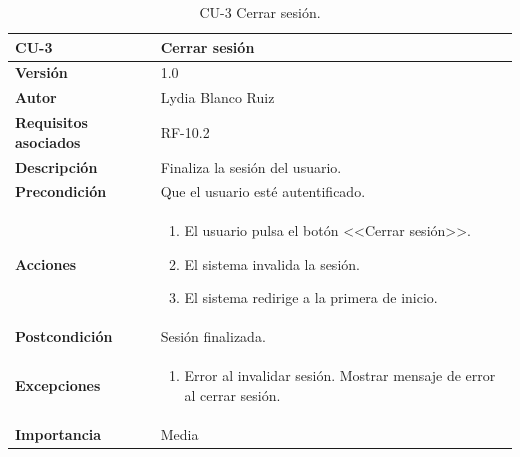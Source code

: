\begin{table}[p]
	\centering
	\begin{tabularx}{\linewidth}{ p{} p{} }
		\toprule
		\textbf{CU-3}    & \textbf{Cerrar sesión}\\
		\toprule
		\textbf{Versión}              & 1.0    \\
		\textbf{Autor}                & Lydia Blanco Ruiz \\
		\textbf{Requisitos asociados} & RF-10.2 \\
		\textbf{Descripción}          & Finaliza la sesión del usuario. \\
		\textbf{Precondición}         & Que el usuario esté autentificado. \\
		\textbf{Acciones}             &
		\begin{enumerate}
			\def\labelenumi{\arabic{enumi}.}
			\tightlist
			\item El usuario pulsa el botón <<Cerrar sesión>>.
			\item El sistema invalida la sesión.
			\item El sistema redirige a la primera de inicio.
		\end{enumerate}\\
		\textbf{Postcondición}        & Sesión finalizada. \\
		\textbf{Excepciones}          & 
		\begin{enumerate}
			\def\labelenumi{\arabic{enumi}.}
			\tightlist
			\item Error al invalidar sesión. Mostrar mensaje de error al cerrar sesión. 	
		\end{enumerate}\\
		\textbf{Importancia}          & Media  \\
		\bottomrule
	\end{tabularx}
	\caption{CU-3 Cerrar sesión.}
\end{table}

